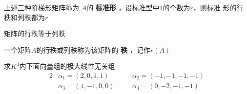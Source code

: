 \documentclass[11pt]{article}
\begin{document}
上述三种阶梯形矩阵称为 \(A\)的 \textbf{标准形} ，设标准型中\(1\)的个数为\(r\)，则标准
形的行秩和列秩都为\(r\)

\begin{proposition}[]
矩阵的行秩等于列秩
\end{proposition}

\begin{definition}[]
一个矩阵\(A\)的行秩或列秩称为该矩阵的 \textbf{秩} ，记作\(r(A)\)
\end{definition}

\begin{proposition}[]
求\(K^4\)内下面向量组的极大线性无关组
\begin{alignat*}{2}
&\alpha_1=(2,0,1,1)&&\alpha_2=(-1,-1,-1,-1)\\
&\alpha_3=(1,-1,0,0)\quad&&\alpha_4=(0,-2,-1,-1)
\end{alignat*}
\end{proposition}
\end{document}
